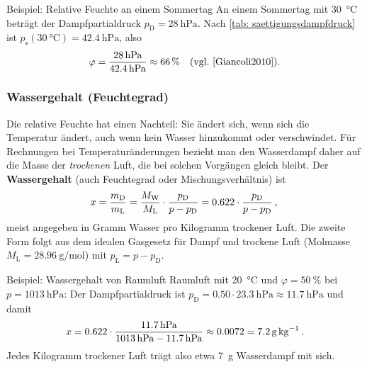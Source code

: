 \begin{examplebox}[]{Beispiel: Relative Feuchte an einem Sommertag}
    An einem Sommertag mit \SI{30}{\celsius} beträgt der Dampfpartialdruck $p_\text{D} = \SI{28}{\hecto\pascal}$. Nach \cref{tab: saettigungsdampfdruck} ist $p_\text{s}(\SI{30}{\celsius}) = \SI{42.4}{\hecto\pascal}$, also
    \begin{equation*}
        \varphi = \frac{\SI{28}{\hecto\pascal}}{\SI{42.4}{\hecto\pascal}} \approx \SI{66}{\percent} \quad \text{(vgl.~\cite[S.~638]{Giancoli2010}).}
    \end{equation*}
\end{examplebox}

\subsubsection*{Wassergehalt (Feuchtegrad)}
Die relative Feuchte hat einen Nachteil: Sie ändert sich, wenn sich die Temperatur ändert, auch wenn kein Wasser hinzukommt oder verschwindet. Für Rechnungen bei Temperaturänderungen bezieht man den Wasserdampf daher auf die Masse der \textit{trockenen} Luft, die bei solchen Vorgängen gleich bleibt. Der \textbf{Wassergehalt} (auch Feuchtegrad oder Mischungsverhältnis) ist
\begin{equation}\label{eq: wassergehalt}
    x = \frac{m_\text{D}}{m_\text{L}} = \frac{M_\text{W}}{M_\text{L}} \cdot \frac{p_\text{D}}{p - p_\text{D}} = \num{0.622} \cdot \frac{p_\text{D}}{p - p_\text{D}} \,{,}\,
\end{equation}
meist angegeben in Gramm Wasser pro Kilogramm trockener Luft. Die zweite Form folgt aus dem idealen Gasgesetz für Dampf und trockene Luft (Molmasse $M_\text{L} = \SI{28.96}{\gram\per\mol}$) mit $p_\text{L} = p - p_\text{D}$.

\begin{examplebox}[]{Beispiel: Wassergehalt von Raumluft}
    Raumluft mit \SI{20}{\celsius} und $\varphi = \SI{50}{\percent}$ bei $p = \SI{1013}{\hecto\pascal}$: Der Dampfpartialdruck ist $p_\text{D} = \num{0.50} \cdot \SI{23.3}{\hecto\pascal} \approx \SI{11.7}{\hecto\pascal}$ und damit
    \begin{equation*}
        x = \num{0.622} \cdot \frac{\SI{11.7}{\hecto\pascal}}{\SI{1013}{\hecto\pascal} - \SI{11.7}{\hecto\pascal}} \approx \num{0.0072} = \SI{7.2}{\gram\per\kilogram} \mDot
    \end{equation*}
    Jedes Kilogramm trockener Luft trägt also etwa \SI{7}{\gram} Wasserdampf mit sich.
\end{examplebox}

